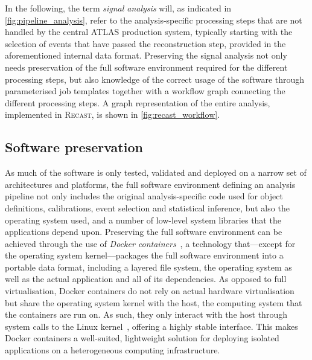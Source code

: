  In the following, the term \textit{signal analysis} will, as indicated in \cref{fig:pipeline_analysis}, refer to the analysis-specific processing steps that are not handled by the central ATLAS production system, typically starting with the selection of events that have passed the reconstruction step, provided in the aforementioned internal data format. Preserving the signal analysis not only needs preservation of the full software environment required for the different processing steps, but also knowledge of the correct usage of the software through parameterised job templates together with a workflow graph connecting the different processing steps. A graph representation of the entire analysis, implemented in \textsc{Recast}, is shown in \cref{fig:recast_workflow}.

\subsection{Software preservation}

As much of the software is only tested, validated and deployed on a narrow set of architectures and platforms, the full software environment defining an analysis pipeline not only includes the original analysis-specific code used for object definitions, calibrations, event selection and statistical inference, but also the operating system used, and a number of low-level system libraries that the applications depend upon.
Preserving the full software environment can be achieved through the use of \textit{Docker containers}~\cite{docker,Binet:2134524}, a technology that---except for the operating system kernel---packages the full software environment into a portable data format, including a layered file system, the operating system as well as the actual application and all of its dependencies.
As opposed to full virtualisation, Docker containers do not rely on actual hardware virtualisation but share the operating system kernel with the host, \ie the computing system that the containers are run on. As such, they only interact with the host through system calls to the Linux kernel~\cite{Binet:2134524}, offering a highly stable interface. This makes Docker containers a well-suited, lightweight solution for deploying isolated applications on a heterogeneous computing infrastructure.

